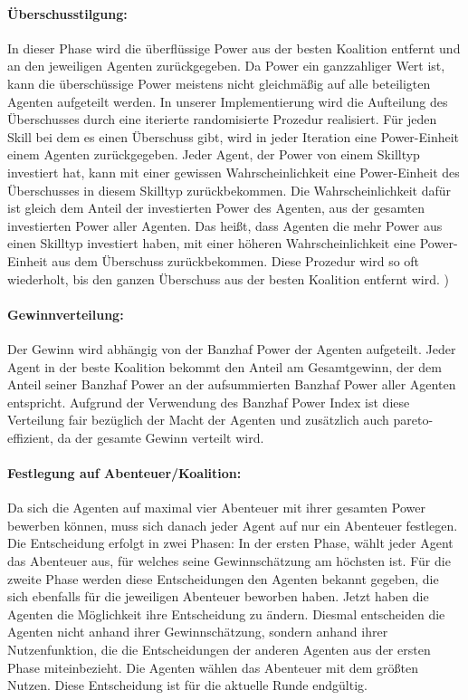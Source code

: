 \documentclass[fleqn,10pt]{SelfArx} %
\begin{document}
\paragraph{Überschusstilgung:} 
In dieser Phase wird die überflüssige Power aus der besten Koalition entfernt und an den jeweiligen Agenten zurückgegeben. Da Power ein ganzzahliger Wert ist, kann die überschüssige Power meistens nicht gleichmäßig auf alle beteiligten Agenten aufgeteilt werden. In unserer Implementierung wird die Aufteilung des Überschusses durch eine iterierte randomisierte Prozedur realisiert. Für jeden Skill bei dem es einen Überschuss gibt, wird in jeder Iteration eine Power-Einheit einem Agenten zurückgegeben. Jeder Agent, der Power von einem Skilltyp investiert hat, kann mit einer gewissen Wahrscheinlichkeit eine Power-Einheit des Überschusses in diesem Skilltyp zurückbekommen. Die Wahrscheinlichkeit dafür ist gleich dem Anteil der investierten Power des Agenten, aus der gesamten investierten Power aller Agenten. Das heißt, dass Agenten die mehr Power aus einen Skilltyp investiert haben, mit einer höheren Wahrscheinlichkeit eine Power-Einheit aus dem Überschuss zurückbekommen. Diese Prozedur wird so oft wiederholt, bis den ganzen Überschuss aus der besten Koalition entfernt wird.
)
\paragraph{Gewinnverteilung:}
Der Gewinn wird abhängig von der Banzhaf Power der Agenten aufgeteilt. Jeder Agent in der beste Koalition bekommt den Anteil am Gesamtgewinn, der dem Anteil seiner Banzhaf Power an der aufsummierten Banzhaf Power aller Agenten entspricht. Aufgrund der Verwendung des Banzhaf Power Index ist diese Verteilung fair bezüglich der Macht der Agenten und zusätzlich auch pareto-effizient, da der gesamte Gewinn verteilt wird.

\paragraph{Festlegung auf Abenteuer/Koalition:}
Da sich die Agenten auf maximal vier Abenteuer mit ihrer gesamten Power bewerben können, muss sich danach jeder Agent auf nur ein Abenteuer festlegen. Die Entscheidung erfolgt in zwei Phasen: In der ersten Phase, wählt jeder Agent das Abenteuer aus, für welches seine Gewinnschätzung am höchsten ist. Für die zweite Phase werden diese Entscheidungen den Agenten bekannt gegeben, die sich ebenfalls für die jeweiligen Abenteuer beworben haben. Jetzt haben die Agenten die Möglichkeit ihre Entscheidung zu ändern. Diesmal entscheiden die Agenten nicht anhand ihrer Gewinnschätzung, sondern anhand ihrer Nutzenfunktion, die die Entscheidungen der anderen Agenten aus der ersten Phase miteinbezieht. Die Agenten wählen das Abenteuer mit dem größten Nutzen. Diese Entscheidung ist für die aktuelle Runde endgültig.
\end{document}

